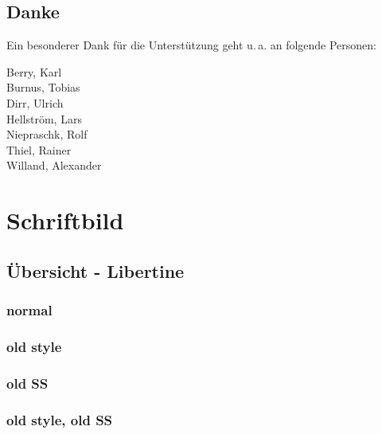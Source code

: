 \documentclass{fontdokuold}
\begin{document}
\section{Danke}

Ein besonderer Dank für die Unterstützung geht u.\,a. an folgende Personen:

\begin{multicols}{2}
Berry, Karl\\
Burnus, Tobias\\
Dirr, Ulrich\\
Hellström, Lars\\
Niepraschk, Rolf\\
Thiel, Rainer\\
Willand, Alexander\\
\end{multicols}












\chapter{Schriftbild}

\section{Übersicht - Libertine}

\subsection{normal}

\subsection{old style}

\subsection{old SS}

\subsection{old style, old SS}
\end{document}
